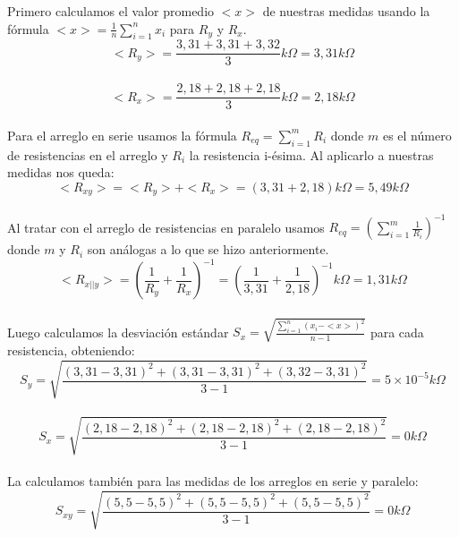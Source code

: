 \documentclass[12pt]{article}
\begin{document}
	\noindent Primero calculamos el valor promedio $<x>$ de nuestras medidas usando la fórmula $<x> = \frac{1}{n}\sum_{i=1}^n x_i$ para $R_y$ y $R_x$.
	\\
	\begin{equation}
		<R_y> = \frac{3,31 + 3,31 + 3,32}{3} k\Omega = 3,31 k\Omega
	\end{equation}
	\\
	\begin{equation}
		<R_x> = \frac{2,18 + 2,18 + 2,18}{3} k\Omega = 2,18 k\Omega
	\end{equation}
	\\
	\noindent Para el arreglo en serie usamos la fórmula $R_{eq} = \sum_{i=1}^m R_i$ donde $m$ es el número de resistencias en el arreglo y $R_i$ la resistencia i-ésima. Al aplicarlo a nuestras medidas nos queda:\\
	\begin{equation}
		<R_{xy}> = <R_y> + <R_x> = (3,31 + 2,18)k\Omega = 5,49k\Omega
	\end{equation}
	\\
	\noindent Al tratar con el arreglo de resistencias en paralelo usamos $R_{eq} = (\sum_{i=1}^m \frac{1}{R_i})^{-1}$ donde $m$ y $R_i$ son análogas a lo que se hizo anteriormente.\\
	\begin{equation}
		<R_{x||y}> = (\frac{1}{R_y} + \frac{1}{R_x})^{-1} = (\frac{1}{3,31} + \frac{1}{2,18})^{-1}k\Omega = 1,31k\Omega
	\end{equation}
	\\
	\noindent Luego calculamos la desviación estándar $S_x = \sqrt{\frac{\sum_{i=1}^n(x_i - <x>)^2}{n - 1}}$ para cada resistencia, obteniendo:\\
	\begin{equation}
		S_y = \sqrt{\frac{(3,31 - 3,31)^2 + (3,31 - 3,31)^2 + (3,32 - 3,31)^2}{3 - 1}} = 5 \times 10^{-5} k\Omega
	\end{equation}
	\\
	\begin{equation}
		S_x = \sqrt{\frac{(2,18 - 2,18)^2 + (2,18 - 2,18)^2 + (2,18 - 2,18)^2}{3 - 1}} = 0 k\Omega
	\end{equation}
	\\
	\noindent La calculamos también para las medidas de los arreglos en serie y paralelo:\\
	\begin{equation}
		S_{xy} = \sqrt{\frac{(5,5 - 5,5)^2 + (5,5 - 5,5)^2 + (5,5 - 5,5)^2}{3 - 1}} = 0 k\Omega
	\end{equation}
\end{document}
